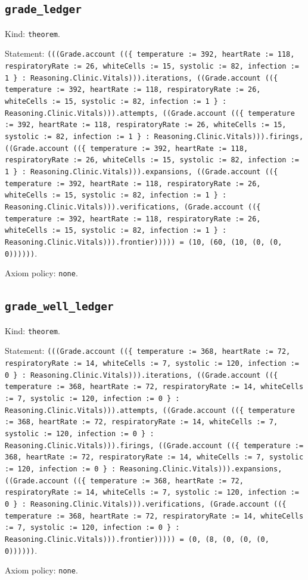 \documentclass[11pt]{article}
\begin{document}
\subsection*{\texttt{grade\_ledger}}
\noindent Kind: \texttt{theorem}.\par
\noindent Statement: \texttt{(((Grade.account ((\{ temperature := 392, heartRate := 118, respiratoryRate := 26, whiteCells := 15, systolic := 82, infection := 1 \} : Reasoning.Clinic.Vitals))).iterations, ((Grade.account ((\{ temperature := 392, heartRate := 118, respiratoryRate := 26, whiteCells := 15, systolic := 82, infection := 1 \} : Reasoning.Clinic.Vitals))).attempts, ((Grade.account ((\{ temperature := 392, heartRate := 118, respiratoryRate := 26, whiteCells := 15, systolic := 82, infection := 1 \} : Reasoning.Clinic.Vitals))).firings, ((Grade.account ((\{ temperature := 392, heartRate := 118, respiratoryRate := 26, whiteCells := 15, systolic := 82, infection := 1 \} : Reasoning.Clinic.Vitals))).expansions, ((Grade.account ((\{ temperature := 392, heartRate := 118, respiratoryRate := 26, whiteCells := 15, systolic := 82, infection := 1 \} : Reasoning.Clinic.Vitals))).verifications, (Grade.account ((\{ temperature := 392, heartRate := 118, respiratoryRate := 26, whiteCells := 15, systolic := 82, infection := 1 \} : Reasoning.Clinic.Vitals))).frontier))))) = (10, (60, (10, (0, (0, 0))))))}.\par
\noindent Axiom policy: \texttt{none}.\par
\subsection*{\texttt{grade\_well\_ledger}}
\noindent Kind: \texttt{theorem}.\par
\noindent Statement: \texttt{(((Grade.account ((\{ temperature := 368, heartRate := 72, respiratoryRate := 14, whiteCells := 7, systolic := 120, infection := 0 \} : Reasoning.Clinic.Vitals))).iterations, ((Grade.account ((\{ temperature := 368, heartRate := 72, respiratoryRate := 14, whiteCells := 7, systolic := 120, infection := 0 \} : Reasoning.Clinic.Vitals))).attempts, ((Grade.account ((\{ temperature := 368, heartRate := 72, respiratoryRate := 14, whiteCells := 7, systolic := 120, infection := 0 \} : Reasoning.Clinic.Vitals))).firings, ((Grade.account ((\{ temperature := 368, heartRate := 72, respiratoryRate := 14, whiteCells := 7, systolic := 120, infection := 0 \} : Reasoning.Clinic.Vitals))).expansions, ((Grade.account ((\{ temperature := 368, heartRate := 72, respiratoryRate := 14, whiteCells := 7, systolic := 120, infection := 0 \} : Reasoning.Clinic.Vitals))).verifications, (Grade.account ((\{ temperature := 368, heartRate := 72, respiratoryRate := 14, whiteCells := 7, systolic := 120, infection := 0 \} : Reasoning.Clinic.Vitals))).frontier))))) = (0, (8, (0, (0, (0, 0))))))}.\par
\noindent Axiom policy: \texttt{none}.\par
\end{document}
